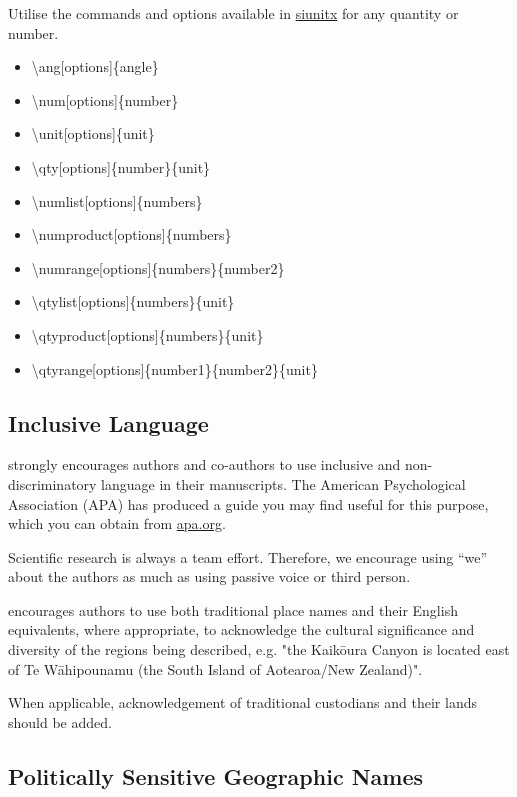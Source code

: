 \documentclass[submission, anonymous]{sedimentologika}
\begin{document}
Utilise the commands and options available in \href{https://mirrors.ctan.org/macros/latex/contrib/siunitx/siunitx-code.pdf}{siunitx} for any quantity or number.
\begin{itemize}
  \item \textbackslash ang[options]\{angle\}
  \item \textbackslash num[options]\{number\}
  \item \textbackslash unit[options]\{unit\}
  \item \textbackslash qty[options]\{number\}\{unit\}
  \item \textbackslash numlist[options]\{numbers\}
  \item \textbackslash numproduct[options]\{numbers\}
  \item \textbackslash numrange[options]\{numbers\}\{number2\}
  \item \textbackslash qtylist[options]\{numbers\}\{unit\}
  \item \textbackslash qtyproduct[options]\{numbers\}\{unit\}
  \item \textbackslash qtyrange[options]\{number1\}\{number2\}\{unit\}
\end{itemize}

\subsection{Inclusive Language}

\Sedimentologika\space strongly encourages authors and co-authors to use inclusive and non-discriminatory language in their manuscripts.
The American Psychological Association (APA) has produced a guide you may find useful for this purpose, which you can obtain from \href{https://www.apa.org/about/apa/equity-diversity-inclusion/language-guidelines}{apa.org}.

Scientific research is always a team effort.
Therefore, we encourage using “we” about the authors as much as using passive voice or third person.

\Sedimentologika\space encourages authors to use both traditional place names and their English equivalents, where appropriate, to acknowledge the cultural significance and diversity of the regions being described, e.g. "the Kaikōura Canyon is located east of Te Wāhipounamu (the South Island of Aotearoa/New Zealand)".

When applicable, acknowledgement of traditional custodians and their lands should be added.

\subsection{Politically Sensitive Geographic Names}
\end{document}
